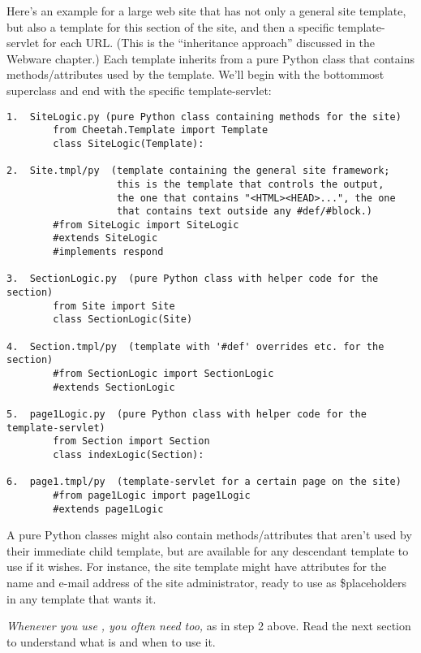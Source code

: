 Here's an example for a large web site that has not only a general site
template, but also a template for this section of the site, and then a
specific template-servlet for each URL.  (This is the ``inheritance
approach'' discussed in the Webware chapter.)  Each template inherits from a
pure Python class that contains methods/attributes used by the template.  We'll
begin with the bottommost superclass and end with the specific
template-servlet:

\begin{verbatim}
1.  SiteLogic.py (pure Python class containing methods for the site)
        from Cheetah.Template import Template
        class SiteLogic(Template):

2.  Site.tmpl/py  (template containing the general site framework;
                   this is the template that controls the output,
                   the one that contains "<HTML><HEAD>...", the one
                   that contains text outside any #def/#block.)
        #from SiteLogic import SiteLogic
        #extends SiteLogic
        #implements respond

3.  SectionLogic.py  (pure Python class with helper code for the section)
        from Site import Site
        class SectionLogic(Site)

4.  Section.tmpl/py  (template with '#def' overrides etc. for the section)
        #from SectionLogic import SectionLogic
        #extends SectionLogic

5.  page1Logic.py  (pure Python class with helper code for the template-servlet)
        from Section import Section
        class indexLogic(Section):

6.  page1.tmpl/py  (template-servlet for a certain page on the site)
        #from page1Logic import page1Logic
        #extends page1Logic
\end{verbatim}

A pure Python classes might also contain methods/attributes that aren't used by
their immediate child template, but are available for any descendant
template to use if it wishes.  For instance, the site template might have
attributes for the name and e-mail address of the site administrator, 
ready to use as \$placeholders in any template that wants it.

{\em Whenever you use , you often need 
too,} as in step 2 above.  Read the next section to understand what
 is and when to use it.


